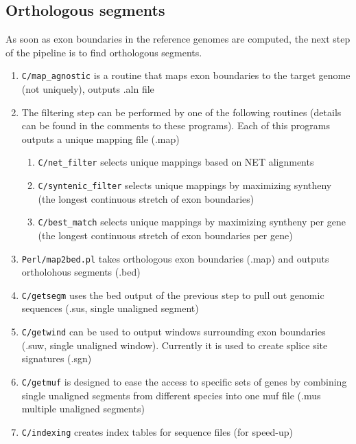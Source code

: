 \documentclass{article}
\begin{document}
\subsection{Orthologous segments}
As soon as exon boundaries in the reference genomes are computed, the next step of the pipeline is to find orthologous segments.
\begin{enumerate}
\item {\tt C/map\_agnostic} is a routine that maps exon boundaries to the target genome (not uniquely), outputs .aln file
\item The filtering step can be performed by one of the following routines (details can be found in the comments to these programs). 
Each of this programs outputs a unique mapping file (.map)
\begin{enumerate}
\item {\tt C/net\_filter} selects unique mappings based on NET alignments
\item {\tt C/syntenic\_filter} selects unique mappings by maximizing syntheny (the longest continuous stretch of exon boundaries)
\item {\tt C/best\_match} selects unique mappings by maximizing syntheny per gene (the longest continuous stretch of exon boundaries per gene)
\end{enumerate}
\item {\tt Perl/map2bed.pl} takes orthologous exon boundaries (.map) and outputs ortholohous segments (.bed)
\item {\tt C/getsegm} uses the bed output of the previous step to pull out genomic sequences (.sus, single unaligned segment) 
\item {\tt C/getwind} can be used to output windows surrounding exon boundaries (.suw, single unaligned window). Currently it is used to create splice site signatures (.sgn)
\item {\tt C/getmuf} is designed to ease the access to specific sets of genes by combining single unaligned segments from different species into one muf file (.mus multiple unaligned segments)
\item {\tt C/indexing} creates index tables for sequence files (for speed-up)
\end{enumerate}
\end{document}
